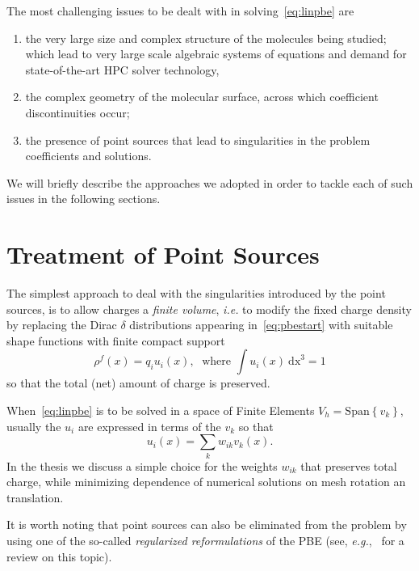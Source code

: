 \documentclass[11pt,a4paper,twocolumn]{article}
\begin{document}
The most challenging issues to be dealt with in solving~\eqref{eq:linpbe}  are
\begin{enumerate}
    \item the very large size and complex structure of the molecules being studied;
    which lead to very large scale algebraic systems of equations and demand  for state-of-the-art
    HPC solver technology,
    \item the complex geometry of the molecular surface, across which coefficient discontinuities
    occur;
    \item the presence of point sources that lead to singularities in the problem coefficients and solutions.
\end{enumerate}

We will briefly describe the approaches we a\-dop\-ted in order to tackle each of such issues in the following sections.

\section{Treatment of Point Sources}

The simplest approach to deal with the singularities 
introduced by the point sources, is to allow charges 
a \emph{finite volume}, \textit{i.e.} to modify the
fixed charge density by replacing the Dirac $\delta$ 
distributions appearing in~\eqref{eq:pbestart} with
suitable shape functions with finite compact support
\begin{equation}
\label{eq:ui}
    \rho^f(x) = q_i u_i(x),\; \mbox{ where }
  \int  u_i(x)\ \mathrm{dx}^3 = 1 
\end{equation}
so that the total (net) amount of charge is preserved.

When~\eqref{eq:linpbe} is to be solved in a space of
Finite Elements $V_h = \mathrm{Span} \left\{ v_k \right\}$,
usually the $u_i$ are expressed in terms of the $v_k$
so that
\begin{equation}
\label{eq:uivk}
u_i(x) = \sum_k w_{ik} v_k(x).
\end{equation}
In the thesis we discuss a simple 
choice for the weights $ w_{ik}$ 
that preserves total charge, while minimizing dependence
of numerical solutions on mesh rotation an translation.

It is worth noting  that point sources can also 
be eliminated from the problem by using
one of the so-called \emph{regularized reformulations} of the PBE (see, {\it e.g.},~\cite{ref16} for a review
on this topic).
\end{document}
